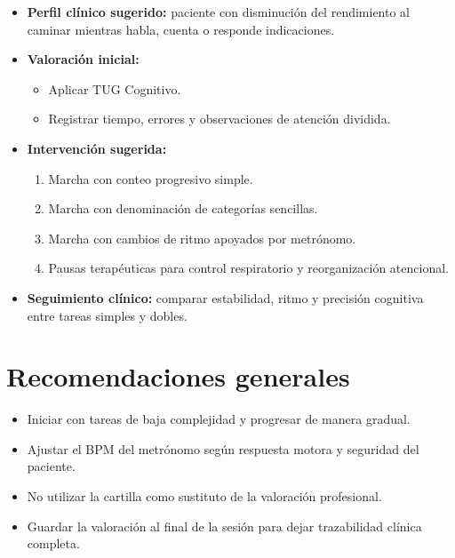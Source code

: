 \documentclass[12pt,a4paper]{article}
\begin{document}
\begin{itemize}
    \item \textbf{Perfil clínico sugerido:} paciente con disminución del rendimiento al caminar mientras habla, cuenta o responde indicaciones.
    \item \textbf{Valoración inicial:}
    \begin{itemize}
        \item Aplicar TUG Cognitivo.
        \item Registrar tiempo, errores y observaciones de atención dividida.
    \end{itemize}
    \item \textbf{Intervención sugerida:}
    \begin{enumerate}
        \item Marcha con conteo progresivo simple.
        \item Marcha con denominación de categorías sencillas.
        \item Marcha con cambios de ritmo apoyados por metrónomo.
        \item Pausas terapéuticas para control respiratorio y reorganización atencional.
    \end{enumerate}
    \item \textbf{Seguimiento clínico:} comparar estabilidad, ritmo y precisión cognitiva entre tareas simples y dobles.
\end{itemize}

\section{Recomendaciones generales}

\begin{itemize}
    \item Iniciar con tareas de baja complejidad y progresar de manera gradual.
    \item Ajustar el BPM del metrónomo según respuesta motora y seguridad del paciente.
    \item No utilizar la cartilla como sustituto de la valoración profesional.
    \item Guardar la valoración al final de la sesión para dejar trazabilidad clínica completa.
\end{itemize}
\end{document}
